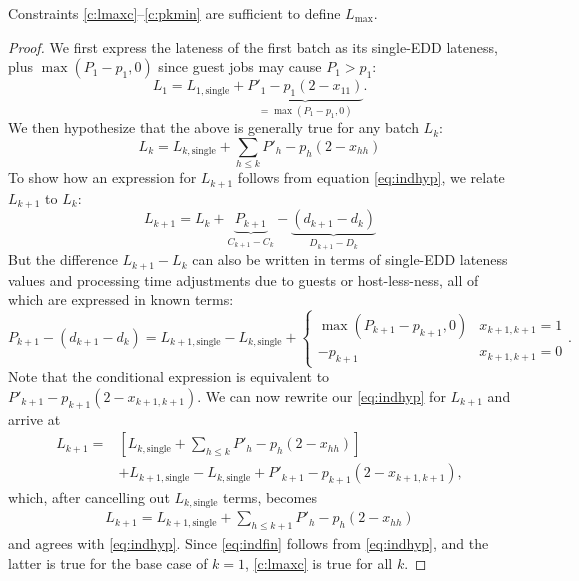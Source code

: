 \documentclass[oribibl]{llncs}
\def\Lmax{{L_{\mathrm{max}}}}
\begin{document}
\begin{proposition}
  Constraints \eqref{c:lmaxc}--\eqref{c:pkmin} are sufficient to define $\Lmax$.
\end{proposition}
\begin{proof}
We first express the lateness of the first batch as its single-EDD lateness,
plus $\max(P_1 - p_1, 0)$ since guest jobs may cause $P_1 > p_1$:
\begin{equation}
  \label{eq:ind1}
  L_1 = L_{1,\mathrm{single}} + \underbrace{P'_1 -
  p_1(2-x_{11})}_{=\max(P_1-p_1,0)}.
\end{equation}
We then hypothesize that the above is generally true for any batch $L_k$:
\begin{equation}
  \label{eq:indhyp}
  L_k = L_{k,\mathrm{single}} + \sum_{h \leq k} P'_h - p_h(2-x_{hh})
\end{equation}
To show how an expression for $L_{k+1}$ follows from equation \eqref{eq:indhyp},
we relate $L_{k+1}$ to $L_k$:
\begin{equation}
  L_{k+1} = L_k + \underbrace{P_{k+1}}_{C_{k+1}-C_k} - \underbrace{(d_{k+1} -
  d_k)}_{D_{k+1}-D_k}
\end{equation}
But the difference $L_{k+1} - L_k$ can also be written in terms of single-EDD
lateness values and processing time adjustments due to guests or host-less-ness,
all of which are expressed in known terms:
\begin{equation}
  \label{eq:ind3}
  P_{k+1} - (d_{k+1} - d_k) = L_{k+1,\mathrm{single}} - L_{k,\mathrm{single}}+
\begin{cases}\max(P_{k+1}-p_{k+1},0)&x_{k+1,k+1}=1\\-p_{k+1}&x_{k+1,k+1}=0\end{cases}.
\end{equation}
Note that the conditional expression is equivalent to $P'_{k+1} -
p_{k+1}(2-x_{k+1, k+1})$. We can now rewrite our \eqref{eq:indhyp} for $L_{k+1}$ and arrive at
\begin{align}
   L_{k+1} =& \left[L_{k,\mathrm{single}} + \sum_{h \leq k} P'_h
- p_h(2-x_{hh})\right] \\ &+ L_{k+1,\mathrm{single}} - L_{k,\mathrm{single}}+ P'_{k+1} -
p_{k+1}(2-x_{k+1, k+1}),
\end{align}
which, after cancelling out $L_{k,\mathrm{single}}$ terms, becomes
\begin{align}
  \label{eq:indfin}
 L_{k+1} = L_{k+1,\mathrm{single}} + \sum_{h \leq k+1} P'_h - p_h(2-x_{hh})
\end{align}
and agrees with \eqref{eq:indhyp}. Since \eqref{eq:indfin} follows from
\eqref{eq:indhyp}, and the latter is true for the base case of $k = 1$,
\eqref{c:lmaxc} is true for all $k$.


\end{proof}
\end{document}
